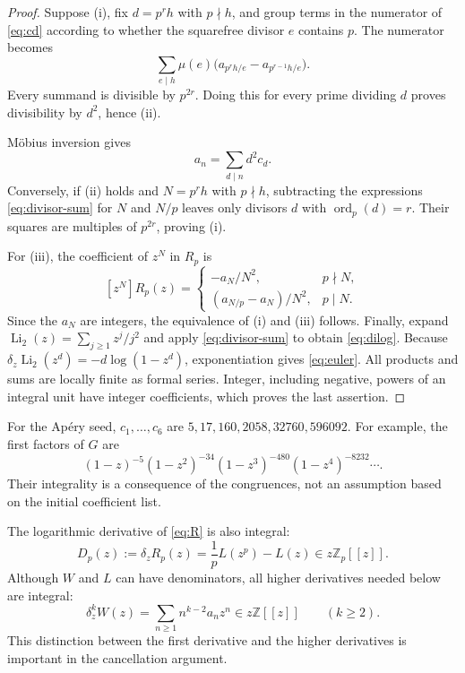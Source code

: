 \documentclass[11pt,letterpaper]{article}
\numberwithin{equation}{section}
\theoremstyle{definition}
\theoremstyle{remark}
\newcommand{\Z}{\mathbb Z}
\newcommand{\Zp}{\mathbb Z_p}
\newcommand{\vp}{\operatorname{ord}_p}
\newcommand{\Li}{\operatorname{Li}}
\begin{document}
\begin{proof}
Suppose (i), fix $d=p^rh$ with $p\nmid h$, and group terms in the
numerator of \eqref{eq:cd} according to whether the squarefree divisor
$e$ contains $p$. The numerator becomes
\[
 \sum_{e\mid h}\mu(e)
       \bigl(a_{p^rh/e}-a_{p^{r-1}h/e}\bigr).
\]
Every summand is divisible by $p^{2r}$. Doing this for every prime dividing
$d$ proves divisibility by $d^2$, hence (ii).

M\"obius inversion gives
\begin{equation}\label{eq:divisor-sum}
 a_n=\sum_{d\mid n}d^2c_d.
\end{equation}
Conversely, if (ii) holds and $N=p^rh$ with $p\nmid h$, subtracting the
expressions \eqref{eq:divisor-sum} for $N$ and $N/p$ leaves only divisors
$d$ with $\vp(d)=r$. Their squares are multiples of $p^{2r}$, proving (i).

For (iii), the coefficient of $z^N$ in $R_p$ is
\begin{equation}\label{eq:defect-coeff}
 [z^N]R_p(z)=
 \begin{cases}
 -a_N/N^2,&p\nmid N,\\
 (a_{N/p}-a_N)/N^2,&p\mid N.
 \end{cases}
\end{equation}
Since the $a_N$ are integers, the equivalence of (i) and (iii) follows.
Finally, expand $\Li_2(z)=\sum_{j\ge1}z^j/j^2$ and apply
\eqref{eq:divisor-sum} to obtain \eqref{eq:dilog}. Because
$\delta_z\Li_2(z^d)=-d\log(1-z^d)$, exponentiation gives
\eqref{eq:euler}. All products and sums are locally finite as formal
series. Integer, including negative, powers of an integral unit have
integer coefficients, which proves the last assertion.
\end{proof}

For the Ap\'ery seed, $c_1,\ldots,c_6$ are
$5,17,160,2058,32760,596092$. For example, the first factors of $G$ are
\[
 (1-z)^{-5}(1-z^2)^{-34}(1-z^3)^{-480}(1-z^4)^{-8232}\cdots.
\]
Their integrality is a consequence of the congruences, not an assumption
based on the initial coefficient list.

The logarithmic derivative of \eqref{eq:R} is also integral:
\begin{equation}\label{eq:D}
 D_p(z):=\delta_zR_p(z)
 =\frac1pL(z^p)-L(z)\in z\Zp[[z]].
\end{equation}
Although $W$ and $L$ can have denominators, all higher derivatives needed
below are integral:
\begin{equation}\label{eq:derivatives}
 \delta_z^kW(z)=\sum_{n\ge1}n^{k-2}a_nz^n
 \in z\Z[[z]]\qquad(k\ge2).
\end{equation}
This distinction between the first derivative and the higher derivatives
is important in the cancellation argument.
\end{document}
